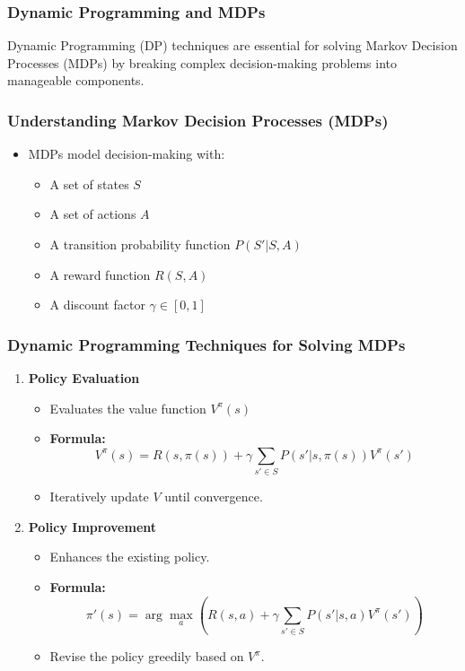 \documentclass[aspectratio=169]{beamer}
\begin{document}
\begin{frame}[fragile]
    \frametitle{Dynamic Programming and MDPs}
    Dynamic Programming (DP) techniques are essential for solving Markov Decision Processes (MDPs) by breaking complex decision-making problems into manageable components.
\end{frame}

\begin{frame}[fragile]
    \frametitle{Understanding Markov Decision Processes (MDPs)}
    \begin{itemize}
        \item MDPs model decision-making with:
        \begin{itemize}
            \item A set of states \( S \)
            \item A set of actions \( A \)
            \item A transition probability function \( P(S' | S, A) \)
            \item A reward function \( R(S, A) \)
            \item A discount factor \( \gamma \in [0, 1] \)
        \end{itemize}
    \end{itemize}
\end{frame}

\begin{frame}[fragile]
    \frametitle{Dynamic Programming Techniques for Solving MDPs}
    \begin{enumerate}
        \item \textbf{Policy Evaluation}
        \begin{itemize}
            \item Evaluates the value function \( V^\pi(s) \)
            \item \textbf{Formula:}
            \begin{equation}
                V^\pi(s) = R(s, \pi(s)) + \gamma \sum_{s' \in S} P(s' | s, \pi(s)) V^\pi(s')
            \end{equation}
            \item Iteratively update \( V \) until convergence.
        \end{itemize}
        
        \item \textbf{Policy Improvement}
        \begin{itemize}
            \item Enhances the existing policy.
            \item \textbf{Formula:}
            \begin{equation}
                \pi'(s) = \arg\max_a \left( R(s, a) + \gamma \sum_{s' \in S} P(s' | s, a) V^\pi(s') \right)
            \end{equation}
            \item Revise the policy greedily based on \( V^\pi \).
        \end{itemize}
    \end{enumerate}    
\end{frame}
\end{document}
